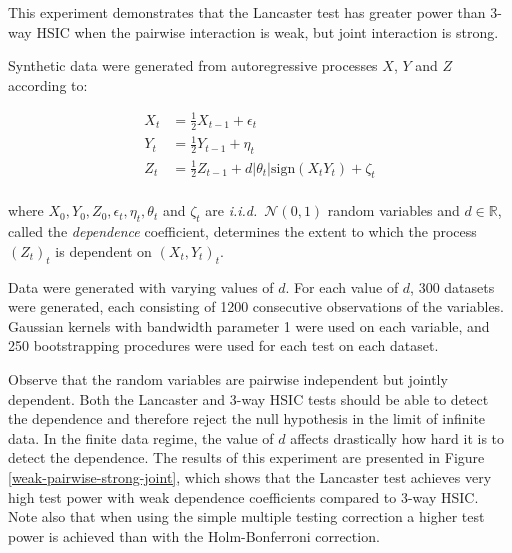 \documentclass[]{article}
\begin{document}
This experiment demonstrates that the Lancaster test has greater power than 3-way HSIC when the pairwise interaction is weak, but joint interaction is strong.


Synthetic data were generated from autoregressive processes $X$, $Y$ and $Z$ according to:

\begin{align*}
X_t &= \frac{1}{2}X_{t-1} + \epsilon_t\\
Y_t &= \frac{1}{2}Y_{t-1} + \eta_t\\
Z_t &= \frac{1}{2}Z_{t-1} + d |\theta_t|\text{sign}(X_t Y_t) + \zeta_t\\
\end{align*}

where $X_0, Y_0, Z_0, \epsilon_t, \eta_t, \theta_t$ and $\zeta_t$ are \emph{i.i.d.}~$\mathcal{N}(0,1)$ random variables and $d\in\mathbb{R}$, called the \emph{dependence} coefficient, determines the extent to which the process $(Z_t)_t$ is dependent on $(X_t,Y_t)_t$.

Data were generated with varying values of $d$. For each value of $d$, 300 datasets were generated, each consisting of 1200 consecutive observations of the variables. Gaussian kernels with bandwidth parameter 1 were used on each variable, and 250 bootstrapping procedures were used for each test on each dataset.

Observe that the random variables are pairwise independent but jointly dependent. Both the Lancaster and 3-way HSIC tests should be able to detect the dependence and therefore reject the null hypothesis in the limit of infinite data. In the finite data regime, the value of $d$ affects drastically how hard it is to detect the dependence. The results of this experiment are presented in Figure \ref{weak-pairwise-strong-joint}, which shows that the Lancaster test achieves very high test power with weak dependence coefficients compared to 3-way HSIC. Note also that when using the simple multiple testing correction a higher test power is achieved than with the Holm-Bonferroni correction.
\end{document}
